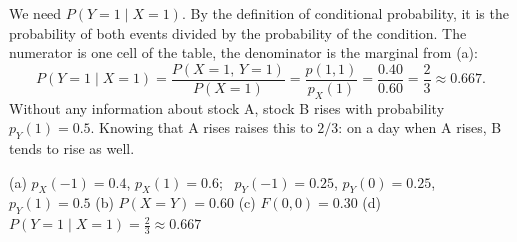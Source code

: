 \begin{solution}
	 We need $P(Y=1\mid X=1)$. By the definition of conditional
	probability, it is the probability of both events divided by the
	probability of the condition. The numerator is one cell of the table,
	the denominator is the marginal from (a):
	\[ P(Y=1\mid X=1)=\frac{P(X=1,\,Y=1)}{P(X=1)}=\frac{p(1,1)}{p_X(1)}
		=\frac{0.40}{0.60}=\frac23\approx0.667. \]
	Without any information about stock A, stock B rises with probability
	$p_Y(1)=0.5$. Knowing that A rises raises this to $2/3$: on a day when A
	rises, B tends to rise as well.
	\begin{answer}
		(a) $p_X(-1)=0.4$, $p_X(1)=0.6$; \ $p_Y(-1)=0.25$, $p_Y(0)=0.25$,
		$p_Y(1)=0.5$
		\quad (b) $P(X=Y)=0.60$
		\quad (c) $F(0,0)=0.30$
		\quad (d) $P(Y=1\mid X=1)=\frac23\approx0.667$
	\end{answer}
\end{solution}
